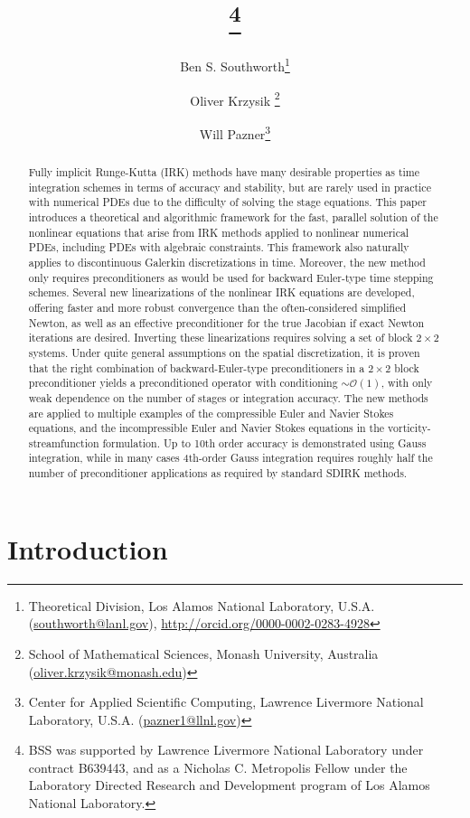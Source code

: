 \documentclass[review]{siamart}
\title{{\TheTitle}\thanks{BSS was supported by Lawrence Livermore National
      Laboratory under contract B639443, and as a Nicholas C. Metropolis Fellow
      under the Laboratory Directed Research and Development program of Los
      Alamos National Laboratory.
  }}
\author{Ben S. Southworth\thanks{Theoretical Division, Los Alamos National Laboratory,
    U.S.A. (\url{southworth@lanl.gov}),
    \url{http://orcid.org/0000-0002-0283-4928}}
    \and
    Oliver Krzysik
  	\thanks{School of Mathematical Sciences, Monash University,
  	Australia (\url{oliver.krzysik@monash.edu})}
  	\and
  	Will Pazner\thanks{Center for Applied Scientific Computing,
  	Lawrence Livermore National Laboratory,
    U.S.A. (\url{pazner1@llnl.gov})}
}
\begin{document}
\maketitle
\allowdisplaybreaks

\begin{abstract}
Fully implicit Runge-Kutta (IRK) methods have many desirable properties as time
integration schemes in terms of accuracy and stability, but are rarely used in
practice with numerical PDEs due to the difficulty of solving the stage equations.
This paper introduces a theoretical and algorithmic framework for the fast,
parallel solution of the nonlinear equations that arise from
IRK methods applied to nonlinear numerical PDEs, including PDEs with algebraic
constraints. This framework also naturally applies to discontinuous
Galerkin discretizations in time. Moreover, the new method only requires
preconditioners as would be used for backward Euler-type time stepping schemes.
Several new linearizations of the nonlinear IRK equations are developed,
offering faster and more robust convergence than the often-considered simplified
Newton, as well as an effective preconditioner for the true Jacobian if exact
Newton iterations are desired. Inverting these linearizations requires solving a
set of block $2\times 2$ systems. Under quite general assumptions on the
spatial discretization, it is proven that the right combination of
backward-Euler-type preconditioners in a $2\times 2$ block preconditioner yields
a preconditioned operator with conditioning $\sim\mathcal{O}(1)$, with only
weak dependence on the number of stages or integration accuracy. The new
methods are applied to multiple examples of the compressible Euler and Navier
Stokes equations, and the incompressible Euler and Navier Stokes equations
in the vorticity-streamfunction formulation. Up to 10th order accuracy is
demonstrated using Gauss integration, while in many cases 4th-order Gauss integration
requires roughly half the number of preconditioner applications as required
by standard SDIRK methods.
\end{abstract}


\section{Introduction}\label{sec:intro}
\end{document}
